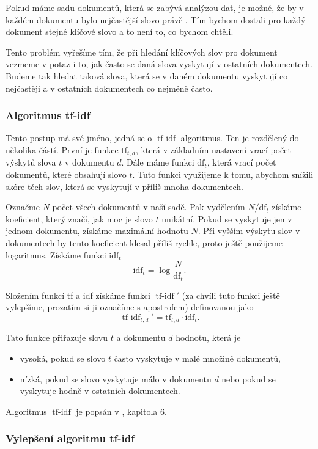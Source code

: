 \documentclass[12pt]{article}
\DeclareMathOperator{\tfidf}{tf-idf}
\begin{document}
Pokud máme sadu dokumentů, která se zabývá analýzou dat, je možné, že by v každém dokumentu bylo nejčastější slovo právě . Tím bychom dostali pro každý dokument stejné klíčové slovo a to není to, co bychom chtěli. 

Tento problém vyřešíme tím, že při hledání klíčových slov pro dokument vezmeme v potaz i to, jak často se daná slova vyskytují v ostatních dokumentech. Budeme tak hledat taková slova, která se v daném dokumentu vyskytují co nejčastěji a v ostatních dokumentech co nejméně často. 


\subsubsection{Algoritmus tf-idf}\label{tfidf}
Tento postup má své jméno, jedná se o $\tfidf$ algoritmus. Ten je rozdělený do několika částí. První je funkce $\mbox{tf}_{t,d}$, která v základním nastavení vrací počet výskytů slova $t$ v dokumentu $d$. Dále máme funkci $\mbox{df}_t$, která vrací počet dokumentů, které obsahují slovo $t$. Tuto funkci využijeme k tomu, abychom snížili skóre těch slov, která se vyskytují v příliš mnoha dokumentech. 

Označme $N$ počet všech dokumentů v naší sadě. Pak vydělením $N/\mbox{df}_t$ získáme koeficient, který značí, jak moc je slovo $t$ unikátní. Pokud se vyskytuje jen v jednom dokumentu, získáme maximální hodnotu $N$. Při vyšším výskytu slov v dokumentech by tento koeficient klesal příliš rychle, proto ještě použijeme logaritmus. Získáme funkci $\mbox{idf}_t$
$$\mbox{idf}_t=\log\frac{N}{\mbox{df}_t}.$$

Složením funkcí tf a idf získáme funkci $\tfidf'$ (za chvíli tuto funkci ještě vylepšíme, prozatím si ji označíme s apostrofem) definovanou jako
$$\tfidf_{t,d}'=\mbox{tf}_{t,d}\cdot\mbox{idf}_t.$$

Tato funkce přiřazuje slovu $t$ a dokumentu $d$ hodnotu, která je

\begin{itemize}
\item vysoká, pokud se slovo $t$ často vyskytuje v malé množině dokumentů,
\item nízká, pokud se slovo vyskytuje málo v dokumentu $d$ nebo pokud se vyskytuje hodně v ostatních dokumentech.
\end{itemize}

Algoritmus $\tfidf$ je popsán v \cite{introir}, kapitola 6. 

\subsubsection{Vylepšení algoritmu tf-idf}
\end{document}
